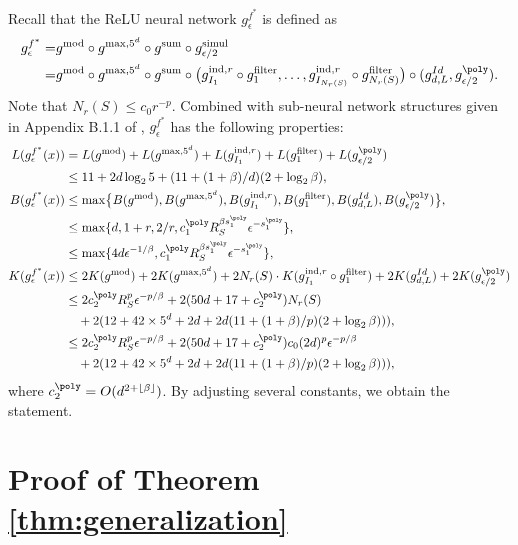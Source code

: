 Recall that the ReLU neural network $g^{f^*}_\epsilon$ is defined as  
\begin{align*}
    g^{f^*}_\epsilon=& g^{\text{mod}}\circ g^{\max,5^d} \circ g^{\text{sum}} \circ g^{\text{simul}}_{\epsilon/2}\\
    =& g^{\text{mod}}\circ g^{\max,5^d} \circ g^{\text{sum}} \circ\bigl(g_{I_1}^{\text{ind},r}\circ g^{\text{filter}}_1 ,\ldots,g_{I_{ N_r(S)}}^{\text{ind},r}
    \circ g^{\text{filter}}_{ N_r(S)} \bigr) 
    \circ (g^{Id}_{d,L},  g^{\poly}_{\epsilon/2}).
\end{align*}
Note that $N_r(S) \leq c_0 r^{-p}$.
Combined with sub-neural network structures given in Appendix B.1.1 of \citet{nakada2020adaptive}, $g^{f^*}_\epsilon$ has the following properties:
\begin{align*}
    L(g^{f^*}_\epsilon(x)) &= L(g^{\text{mod}}) + L(g^{\max,5^d}) + L(g_{I_1}^{\text{ind},r}) + L(g^{\text{filter}}_1) + L(g^{\poly}_{\epsilon/2})\\
    &\leq 11 + 2d \log_2 5 + (11 + (1+\beta)/d)(2 + \log_2\beta),\\
    B(g^{f^*}_\epsilon(x)) &\leq \max\bigl\{B(g^{\text{mod}}), B(g^{\max,5^d}),B(g_{I_1}^{\text{ind},r}),B(g^{\text{filter}}_1) , B(g^{Id}_{d,L}),B(g^{\poly}_{\epsilon/2})\bigr\},\\
    &\leq \max\{d, 1 + r, 2 /r, c_1^{\poly} R_S^{\beta s_1^{\poly}}\epsilon^{-s_1^{\poly}} \},\\
    &\leq \max\{ 4d \epsilon^{-1/\beta} , c_1^{\poly} R_S^{\beta s_1^{\poly}}\epsilon^{-s_1^{\poly}} \},\\
    K(g^{f^*}_\epsilon(x)) &\leq 2K(g^{\text{mod}}) + 2K(g^{\max,5^d})  + 2N_r(S)\cdot K(g_{I_1}^{\text{ind},r}\circ g^{\text{filter}}_1) + 2 K(g^{Id}_{d,L}) + 2K(g^{\poly}_{\epsilon/2})\\
    &\leq  2 c_2^{\poly} R_S^p \epsilon^{-p/\beta} + 2(50d + 17 + c_2^{\poly})   N_r(S)\\
    &\quad+ 2(12 + 42 \times 5^d + 2d + 2d(11 + (1+\beta)/p)(2 + \log_2 \beta))),\\
    &\leq  2 c_2^{\poly} R_S^p \epsilon^{-p/\beta} + 2(50d + 17 + c_2^{\poly})c_0 (2d)^p\epsilon^{-p/\beta}  \\
    &\quad+ 2(12 + 42 \times 5^d + 2d + 2d(11 + (1+\beta)/p)(2 + \log_2 \beta))),
\end{align*}
where $c_2^{\poly}=O(d^{2+\lfloor\beta\rfloor})$. By adjusting several constants, we obtain the statement.




\section{Proof of Theorem \ref{thm:generalization}}\label{sec:proof-generalization}

